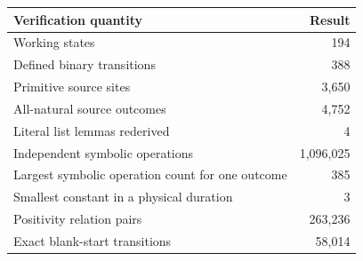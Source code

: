 \begin{center}\begin{tabular}{@{}lr@{}}\toprule Verification quantity & Result\\\midrule
Working states & 194\\
Defined binary transitions & 388\\
Primitive source sites & 3,650\\
All-natural source outcomes & 4,752\\
Literal list lemmas rederived & 4\\
Independent symbolic operations & 1,096,025\\
Largest symbolic operation count for one outcome & 385\\
Smallest constant in a physical duration & 3\\
Positivity relation pairs & 263,236\\
Exact blank-start transitions & 58,014\\
\bottomrule\end{tabular}\end{center}
